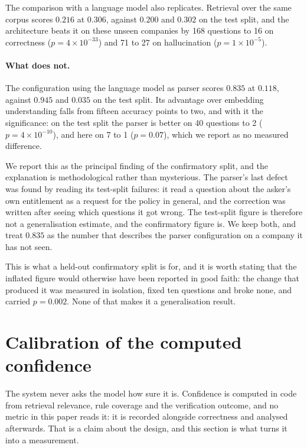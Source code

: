 \documentclass[11pt]{article}
\begin{document}
The comparison with a language model also replicates. Retrieval over the same corpus
scores $0.216$ at $0.306$, against $0.200$ and $0.302$ on the test split, and the
architecture beats it on these unseen companies by 168 questions to 16 on correctness
($p=4\times10^{-33}$) and 71 to 27 on hallucination ($p=1\times10^{-5}$).

\paragraph{What does not.} The configuration using the language model as parser scores
$0.835$ at $0.118$, against $0.945$ and $0.035$ on the test split. Its advantage over
embedding understanding falls from fifteen accuracy points to two, and with it the
significance: on the test split the parser is better on 40 questions to 2
($p=4\times10^{-10}$), and here on 7 to 1 ($p=0.07$), which we report as no measured
difference.

We report this as the principal finding of the confirmatory split, and the explanation is
methodological rather than mysterious. The parser's last defect was found by reading its
test-split failures: it read a question about the asker's own entitlement as a request for
the policy in general, and the correction was written after seeing which questions it got
wrong. The test-split figure is therefore not a generalisation estimate, and the
confirmatory figure is. We keep both, and treat $0.835$ as the number that describes the
parser configuration on a company it has not seen.

This is what a held-out confirmatory split is for, and it is worth stating that the
inflated figure would otherwise have been reported in good faith: the change that produced
it was measured in isolation, fixed ten questions and broke none, and carried $p=0.002$.
None of that makes it a generalisation result.

\begin{table}[t]
\centering\small
{}
\caption{Confirmatory split: five companies generated and frozen after the system was
final, scored once. Rates with 95\% bootstrap intervals.}
\label{tab:confirm}
\end{table}

\section{Calibration of the computed confidence}\label{sec:calibration}
The system never asks the model how sure it is. Confidence is computed in code from
retrieval relevance, rule coverage and the verification outcome, and no metric in this
paper reads it: it is recorded alongside correctness and analysed afterwards. That is a
claim about the design, and this section is what turns it into a measurement.
\end{document}
